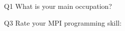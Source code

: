 \begin{description}%
\item{Q1} What is your main occupation?%
\item{Q3} Rate your MPI programming skill:%
\end{description}%
